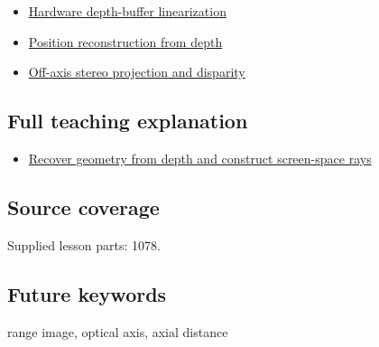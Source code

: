 \begin{itemize}
\tightlist
\item
  \hyperref[appendix-1bc40b08db4a]{Hardware depth-buffer linearization}
\item
  \hyperref[appendix-2cbf2968e866]{Position reconstruction from depth}
\item
  \hyperref[appendix-0976e86e5b9f]{Off-axis stereo projection and disparity}
\end{itemize}

\subsection{Full teaching explanation}\label{full-teaching-explanation}

\begin{itemize}
\tightlist
\item
  \href{Continuous\%20Notes/Computing\%20Foundations\%20-\%20From\%20Bits\%20to\%20C++\%20and\%20Systems\%20APIs\#Recover\%20geometry\%20from\%20depth\%20and\%20construct\%20screen-space\%20rays}{Recover geometry from depth and construct screen-space rays}
\end{itemize}

\subsection{Source coverage}\label{source-coverage}

Supplied lesson parts: 1078.

\subsection{Future keywords}\label{future-keywords}

range image, optical axis, axial distance
